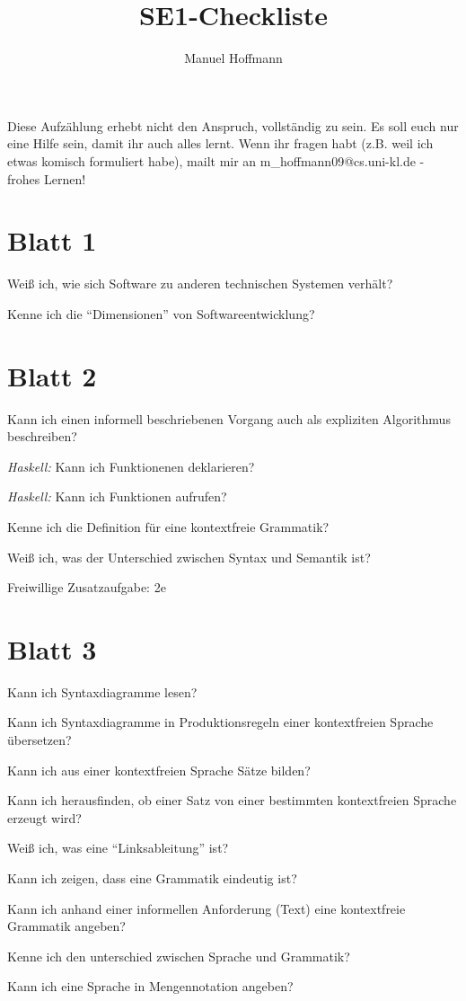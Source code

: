\documentclass{article}
\author{Manuel Hoffmann}
\title{SE1-Checkliste}
\newcommand*{\thecheckbox}{\hss[\hss]}
\newenvironment*{checklist} 
{\list{}{\itemsep -2pt 
\renewcommand*{\makelabel}[1]{\thecheckbox}}} 
{\endlist}
\begin{document}
Diese Aufzählung erhebt nicht den Anspruch, vollständig zu sein. Es soll euch nur eine Hilfe sein, damit ihr auch alles lernt. Wenn ihr fragen habt (z.B. weil ich etwas komisch formuliert habe), mailt mir an m_hoffmann09@cs.uni-kl.de - frohes Lernen!

\section{Blatt 1}

\begin{checklist}
  \item Weiß ich, wie sich Software zu anderen technischen Systemen verhält? 
  \item Kenne ich die "`Dimensionen"' von Softwareentwicklung?
\end{checklist}

\section{Blatt 2}

\begin{checklist}
  \item Kann ich einen informell beschriebenen Vorgang auch als expliziten Algorithmus beschreiben?
  \item \emph{Haskell:} Kann ich Funktionenen deklarieren?
  \item \emph{Haskell:} Kann ich Funktionen aufrufen?
  \item Kenne ich die Definition für eine kontextfreie Grammatik?
  \item Weiß ich, was der Unterschied zwischen Syntax und Semantik ist?
\end{checklist}

Freiwillige Zusatzaufgabe: 2e

\section{Blatt 3}

\begin{checklist}
  \item Kann ich Syntaxdiagramme lesen?
  \item Kann ich Syntaxdiagramme in Produktionsregeln einer kontextfreien Sprache übersetzen?
  \item Kann ich aus einer kontextfreien Sprache Sätze bilden?
  \item Kann ich herausfinden, ob einer Satz von einer bestimmten kontextfreien Sprache erzeugt wird?
  \item Weiß ich, was eine "`Linksableitung"' ist?
  \item Kann ich zeigen, dass eine Grammatik eindeutig ist?
  \item Kann ich anhand einer informellen Anforderung (Text) eine kontextfreie Grammatik angeben?
  \item Kenne ich den unterschied zwischen Sprache und Grammatik?
  \item Kann ich eine Sprache in Mengennotation angeben?
\end{checklist}
\end{document}
